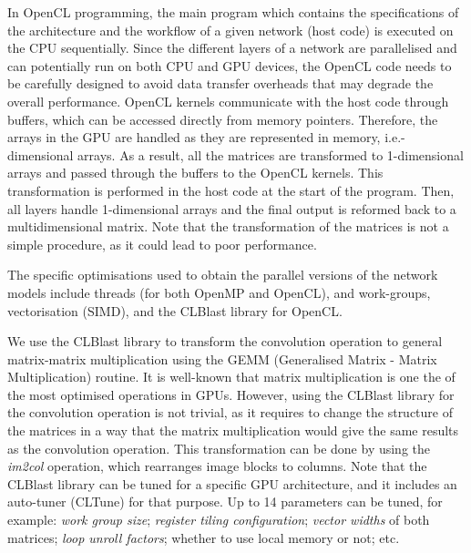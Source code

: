 \documentclass[conference]{IEEEtran}
\begin{document}
In OpenCL programming, the main program which contains the specifications of the architecture and the workflow of a given network (host code) is executed on the CPU sequentially. Since the different layers of a network are parallelised and can potentially run on both CPU and GPU devices, the OpenCL code needs to be carefully designed to avoid data transfer overheads that may degrade the overall performance. OpenCL kernels communicate with the host code through buffers, which can be accessed directly from memory pointers. Therefore, the arrays in the GPU are handled as they are represented in memory, i.e.-dimensional arrays. As a result, all the matrices are transformed to 1-dimensional arrays and passed through the buffers to the OpenCL kernels. This transformation is performed in the host code at the start of the program. Then, all layers handle 1-dimensional arrays and the final output is reformed back to a multidimensional matrix. Note that the transformation of the matrices is not a simple procedure, as it could lead to poor performance.

The specific optimisations used to obtain the parallel versions of the network models include threads (for both OpenMP and OpenCL), and work-groups, vectorisation (SIMD), and the CLBlast library \cite{Nugteren17} for OpenCL.

We use the CLBlast library \cite{Nugteren17} to transform the convolution operation to general matrix-matrix multiplication using the GEMM (Generalised Matrix - Matrix Multiplication) routine. It is well-known that matrix multiplication is one the of the most optimised operations in GPUs. However, using the CLBlast library for the convolution operation is not trivial, as it requires to change the structure of the matrices in a way that the matrix multiplication would give the same results as the convolution operation. This transformation can be done by using the \emph{im2col} operation, which rearranges image blocks to columns. Note that the CLBlast library can be tuned for a specific GPU architecture, and it includes an auto-tuner (CLTune) for that purpose. Up to 14 parameters can be tuned, for example: \emph{work group size}; \emph{register tiling configuration}; \emph{vector widths} of both matrices; \emph{loop unroll factors}; whether to use local memory or not; etc.

\end{document}
